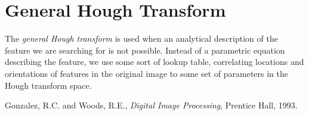 \documentclass[12pt]{article}
\begin{document}
\section*{General Hough Transform}

The \emph{general Hough transform} is used when an analytical description of the feature we are searching for is not possible.  Instead of a parametric equation describing the feature, we use some sort of lookup table, correlating locations and orientations of  features in the original image to some set of parameters in the Hough transform space.

\begin{thebibliography}{9}
Gonzalez, R.C. and Woods, R.E., \textsl{Digital Image Processing}, Prentice Hall, 1993.
\end{thebibliography}
\end{document}
